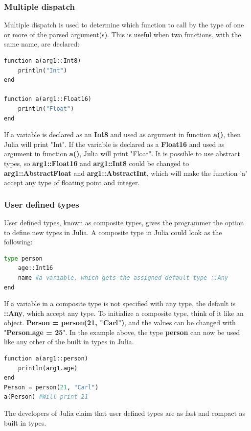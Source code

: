 \documentclass[a4paper, 11pt, titlepage]{article}
\begin{document}
\subsubsection{Multiple dispatch}
Multiple dispatch is used to determine which function to call by the type of one or more of the parsed argument(s). This is useful when two functions, with the same name, are declared:

\begin{lstlisting}[language=python]
function a(arg1::Int8)
	println("Int")  
end

function a(arg1::Float16)  
	println("Float")  
end    
\end{lstlisting}
If a variable is declared as an \textbf{Int8} and used as argument in function \textbf{a()}, then Julia will print "Int". If the variable is declared as a \textbf{Float16} and used as argument in function \textbf{a()}, Julia will print "Float". It is possible to use abstract types, so \textbf{arg1::Float16} and \textbf{arg1::Int8} could be changed to \textbf{arg1::AbstractFloat} and \textbf{arg1::AbstractInt}, which will make the function 'a' accept any type of floating point and integer.
\subsubsection{User defined types}
User defined types, known as composite types, gives the programmer the option to define new types in Julia. A composite type in Julia could look as the following: 
\begin{lstlisting}[language=python]
type person 
	age::Int16 
	name #a variable, which gets the assigned default type ::Any
end    
\end{lstlisting}
If a variable in a composite type is not specified with any type, the default is \textbf{::Any}, which accept any type. To initialize a composite type, think of it like an object. \textbf{Person = person(21, "Carl")}, and the values can be changed with "\textbf{Person.age = 25}".
In the example above, the type \textbf{person} can now be used like any other of the built in types in Julia.
\begin{lstlisting}[language=python]
function a(arg1::person)
	println(arg1.age)
end
Person = person(21, "Carl")
a(Person) #Will print 21
\end{lstlisting}
The developers of Julia claim that user defined types are as fast and compact as built in types. 
\end{document}

